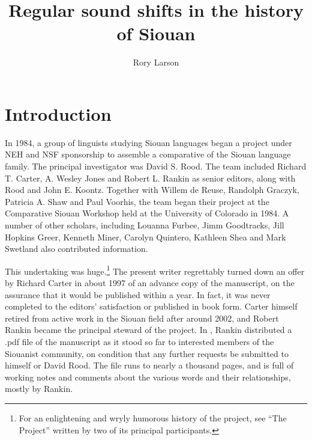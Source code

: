 \documentclass[output=paper]{LSP/langsci}
\author{Rory Larson}
\title{Regular sound shifts in the history of {Siouan}}
\begin{document}
\section{Introduction}  
In 1984, a group of linguists studying Siouan languages began a  project under NEH and NSF sponsorship to assemble a comparative  of the Siouan language family.  The principal investigator was David S. Rood. The team included Richard T. Carter, A. Wesley Jones and Robert L. Rankin as senior editors, along with Rood and John E. Koontz.  Together with Willem de Reuse, Randolph Graczyk, Patricia A. Shaw and Paul Voorhis, the  team began their project at the Comparative Siouan Workshop held at the University of Colorado in 1984.  A number of other scholars, including Louanna Furbee, Jimm Goodtracks, Jill Hopkins Greer, Kenneth Miner, Carolyn Quintero, Kathleen Shea and Mark Swetland also contributed information.

\newpage

This undertaking was huge.\footnote{For an enlightening and wryly humorous history of the project, see ``The  Project'' \citep{RoodKoontz2002} written by two of its principal participants.} The present writer regrettably turned down an offer by Richard Carter in about 1997 of an advance copy of the  manuscript, on the assurance that it would be published within a year.  In fact, it was never completed to the editors' satisfaction or published in book form. Carter himself retired from active work in the Siouan field after around 2002, and Robert Rankin became the principal steward of the project.  In \citeyear{Rankinetal2006PDF}, Rankin distributed a .pdf file of the manuscript as it stood so far to interested members of the Siouanist community, on condition that any further requests be submitted to himself or David Rood.  The file runs to nearly a thousand pages, and is full of working notes and comments about the various words and their relationships, mostly by Rankin.
\end{document}
